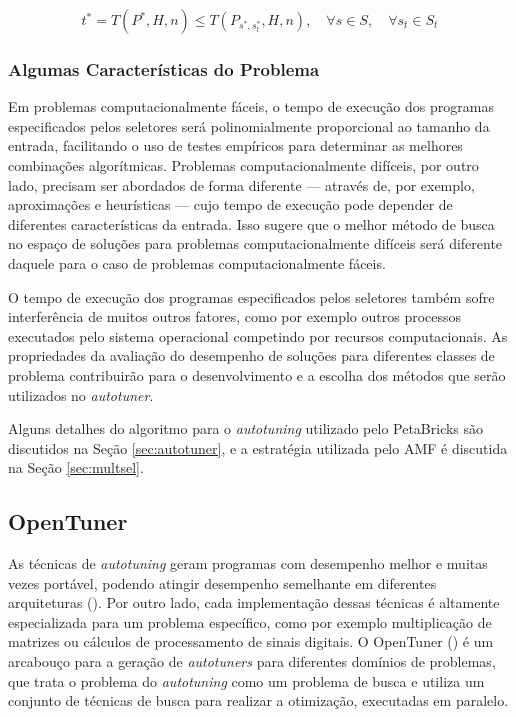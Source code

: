 \documentclass[a4paper, 11pt]{article}
\begin{document}
\begin{equation*}
    t^* = T(P^*,H,n) \leq T(P_{s^*,s_{t}^{*}},H,n), \quad \forall s \in S, \quad \forall s_t \in S_t
\end{equation*}

\subsubsection{Algumas Características do Problema}

Em problemas computacionalmente fáceis, o tempo de execução dos programas
especificados pelos seletores será polinomialmente proporcional ao tamanho da 
entrada, facilitando o uso de testes empíricos para determinar as melhores
combinações algorítmicas. Problemas computacionalmente difíceis, por outro 
lado, precisam ser abordados de forma diferente --- através de, por exemplo,
aproximações e heurísticas --- cujo tempo de execução pode depender de 
diferentes características da entrada. Isso sugere que o melhor método de busca
no espaço de soluções para problemas computacionalmente difíceis será diferente
daquele para o caso de problemas computacionalmente fáceis.

O tempo de execução dos programas especificados pelos seletores também sofre
interferência de muitos outros fatores, como por exemplo outros processos 
executados pelo sistema operacional competindo por recursos computacionais.
As propriedades da avaliação do desempenho de soluções para diferentes classes 
de problema contribuirão para o desenvolvimento e a escolha dos métodos
que serão utilizados no \emph{autotuner}.

Alguns detalhes do algoritmo para o \emph{autotuning} utilizado pelo PetaBricks
são discutidos na Seção \ref{sec:autotuner}, e a estratégia utilizada pelo AMF
é discutida na Seção \ref{sec:multsel}.

\subsection{OpenTuner} \label{sec:opent}

As técnicas de \emph{autotuning} geram programas com desempenho melhor e 
muitas vezes portável, podendo atingir desempenho semelhante em diferentes 
arquiteturas (\citet{demmel2009accelerating}). Por outro lado, cada 
implementação dessas técnicas é altamente especializada para um problema 
específico, como por exemplo multiplicação de matrizes ou cálculos de 
processamento de sinais digitais.
O OpenTuner (\citet{ansel2013opentuner}) é um arcabouço para a geração de 
\emph{autotuners} para diferentes domínios de problemas, que trata o problema
do \emph{autotuning} como um problema de busca e utiliza um conjunto de 
técnicas de busca para realizar a otimização, executadas em paralelo.
\end{document}
